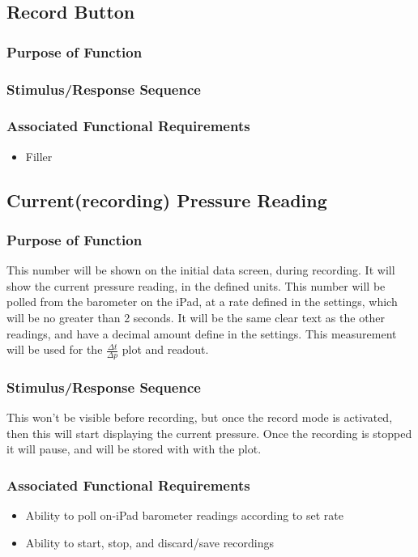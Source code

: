 \documentclass[onecolumn, draftclsnofoot,10pt, compsoc]{IEEEtran}
\begin{document}
\subsection{Record Button}
\subsubsection{Purpose of Function}
\subsubsection{Stimulus/Response Sequence}
\subsubsection{Associated Functional Requirements}
\begin{itemize}
\item Filler
\end{itemize}

\subsection{Current(recording) Pressure Reading}
\subsubsection{Purpose of Function}
This number will be shown on the initial data screen, during recording.
It will show the current pressure reading, in the defined units.
This number will be polled from the barometer on the iPad, at a rate defined in the settings, which will be no greater than 2 seconds.
It will be the same clear text as the other readings, and have a decimal amount define in the settings.
This measurement will be used for the $\frac{\Delta t}{\Delta p}$ plot and readout.
\subsubsection{Stimulus/Response Sequence}
This won't be visible before recording, but once the record mode is activated, then this will start displaying the current pressure.
Once the recording is stopped it will pause, and will be stored with with the plot.
\subsubsection{Associated Functional Requirements}
\begin{itemize}
\item Ability to poll on-iPad barometer readings according to set rate
\item Ability to start, stop, and discard/save recordings
\end{itemize}
\end{document}
